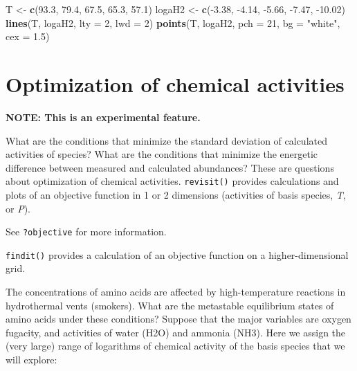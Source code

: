 \documentclass[]{tufte-book}
\newenvironment{Shaded}{}{}
\newcommand{\KeywordTok}[1]{\textcolor[rgb]{0.00,0.44,0.13}{\textbf{#1}}}
\newcommand{\DataTypeTok}[1]{\textcolor[rgb]{0.56,0.13,0.00}{#1}}
\newcommand{\DecValTok}[1]{\textcolor[rgb]{0.25,0.63,0.44}{#1}}
\newcommand{\FloatTok}[1]{\textcolor[rgb]{0.25,0.63,0.44}{#1}}
\newcommand{\StringTok}[1]{\textcolor[rgb]{0.25,0.44,0.63}{#1}}
\newcommand{\OperatorTok}[1]{\textcolor[rgb]{0.40,0.40,0.40}{#1}}
\newcommand{\NormalTok}[1]{#1}
\begin{document}
\begin{Shaded}
\begin{Highlighting}[]
\NormalTok{T <-}\StringTok{ }\KeywordTok{c}\NormalTok{(}\FloatTok{93.3}\NormalTok{, }\FloatTok{79.4}\NormalTok{, }\FloatTok{67.5}\NormalTok{, }\FloatTok{65.3}\NormalTok{, }\FloatTok{57.1}\NormalTok{)}
\NormalTok{logaH2 <-}\StringTok{ }\KeywordTok{c}\NormalTok{(}\OperatorTok{-}\FloatTok{3.38}\NormalTok{, }\OperatorTok{-}\FloatTok{4.14}\NormalTok{, }\OperatorTok{-}\FloatTok{5.66}\NormalTok{, }\OperatorTok{-}\FloatTok{7.47}\NormalTok{, }\OperatorTok{-}\FloatTok{10.02}\NormalTok{)}
\KeywordTok{lines}\NormalTok{(T, logaH2, }\DataTypeTok{lty =} \DecValTok{2}\NormalTok{, }\DataTypeTok{lwd =} \DecValTok{2}\NormalTok{)}
\KeywordTok{points}\NormalTok{(T, logaH2, }\DataTypeTok{pch =} \DecValTok{21}\NormalTok{, }\DataTypeTok{bg =} \StringTok{"white"}\NormalTok{, }\DataTypeTok{cex =} \FloatTok{1.5}\NormalTok{)}
\end{Highlighting}
\end{Shaded}

\hypertarget{optimization-of-chemical-activities}{\chapter{Optimization
of chemical activities}\label{optimization-of-chemical-activities}}

\textbf{NOTE: This is an experimental feature.}

What are the conditions that minimize the standard deviation of
calculated activities of species? What are the conditions that minimize
the energetic difference between measured and calculated abundances?
These are questions about optimization of chemical activities.
{\texttt{revisit()}} provides calculations and plots of an objective
function in 1 or 2 dimensions (activities of basis species, \emph{T}, or
\emph{P}).

\begin{marginfigure}
See {\texttt{?objective}} for more information.
\end{marginfigure}

{\texttt{findit()}} provides a calculation of an objective function on a
higher-dimensional grid.

The concentrations of amino acids are affected by high-temperature
reactions in hydrothermal vents (smokers). What are the metastable
equilibrium states of amino acids under these conditions? Suppose that
the major variables are oxygen fugacity, and activities of water (H2O)
and ammonia (NH3). Here we assign the (very large) range of logarithms
of chemical activity of the basis species that we will explore:
\end{document}
